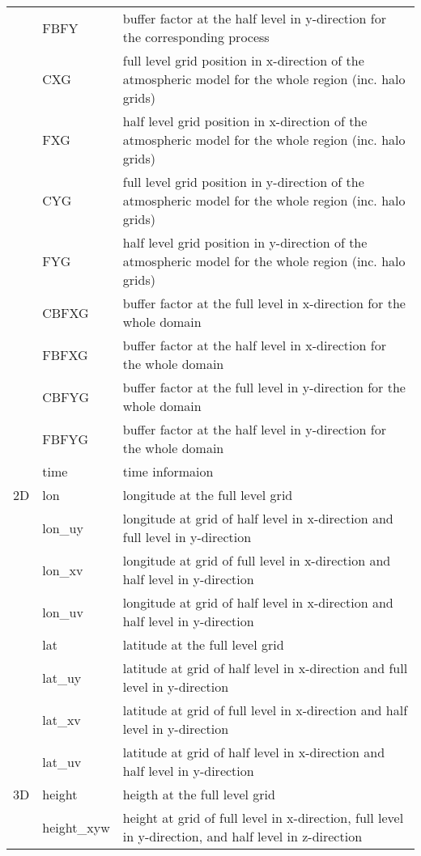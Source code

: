 \begin{longtable}{|l|ll|}
    & FBFY & buffer factor at the half level in y-direction for the corresponding process \\
    & CXG & full level grid position in x-direction of the atmospheric model for the whole region (inc. halo grids) \\
    & FXG & half level grid position in x-direction of the atmospheric model for the whole region (inc. halo grids) \\
    & CYG & full level grid position in y-direction of the atmospheric model for the whole region (inc. halo grids) \\
    & FYG & half level grid position in y-direction of the atmospheric model for the whole region (inc. halo grids) \\
    & CBFXG & buffer factor at the full level in x-direction for the whole domain \\
    & FBFXG & buffer factor at the half level in x-direction for the whole domain \\
    & CBFYG & buffer factor at the full level in y-direction for the whole domain \\
    & FBFYG & buffer factor at the half level in y-direction for the whole domain \\
    & time & time informaion \\
    \hline
    2D
    & lon & longitude at the full level grid \\
    & lon\_uy & longitude at grid of half level in x-direction and full level in y-direction \\
    & lon\_xv & longitude at grid of full level in x-direction and half level in y-direction \\
    & lon\_uv & longitude at grid of half level in x-direction and half level in y-direction \\
    & lat & latitude at the full level grid \\
    & lat\_uy & latitude at grid of half level in x-direction and full level in y-direction \\
    & lat\_xv & latitude at grid of full level in x-direction and half level in y-direction \\
    & lat\_uv & latitude at grid of half level in x-direction and half level in y-direction \\
    \hline
    3D
    & height & heigth at the full level grid \\
    & height\_xyw & height at grid of full level in x-direction, full level in y-direction, and half level in z-direction \\

\end{longtable}
